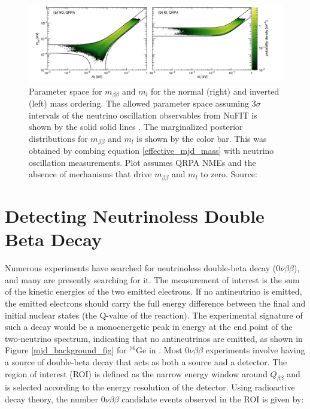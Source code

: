 \begin{figure}[!htb]
\centering
\includegraphics[trim={0.6cm 0cm 1cm 0cm},clip,width=\linewidth]
{ch1/figs/benato_posterior.png}
\caption{Parameter space for $m_{\beta\beta}$ and $m_l$ for the normal (right) and inverted (left) mass ordering. The allowed parameter space assuming $3\sigma$ intervals of the neutrino oscillation observables from NuFIT is shown by the solid solid lines \cite{nufit}. The marginalized posterior distributions for $m_{\beta\beta}$ and $m_l$ is shown by the color bar. This was obtained by combing equation \ref{effective_mjd_mass} with neutrino oscillation measurements. Plot assumes QRPA NMEs and the absence of mechanisms that drive $m_{\beta\beta}$ and $m_l$ to zero. Source: \cite{PhysRevD.96.053001}}
\label{majorana_mass}
\end{figure}


\section{Detecting Neutrinoless Double Beta Decay}
Numerous experiments have searched for neutrinoless double-beta decay ($0\nu\beta\beta$), and many are presently searching for it. The measurement of interest is the sum of the kinetic energies of the two emitted electrons. If no antineutrino is emitted, the emitted electrons should carry the full energy difference between the final and initial nuclear states (the Q-value of the reaction). The experimental signature of such a decay would be a monoenergetic peak in energy at the end point of the two-neutrino spectrum, indicating that no antineutrinos are emitted, as shown in Figure \ref{mjd_background_fig} for ${}^{76}\mathrm{Ge}$ in {\MJD}. Most $0\nu\beta\beta$ experiments involve having a source of double-beta decay that acts as both a source and a detector. The region of interest (ROI) is defined as the narrow energy window around $Q_{\beta\beta}$ and is selected according to the energy resolution of the detector. Using radioactive decay theory, the number $0\nu\beta\beta$ candidate events observed in the ROI is given by: %

